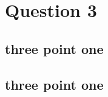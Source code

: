 \documentclass[12pt]{article}
\begin{document}

\section{Question 3}


\subsection{three point one}


\subsection{three point one}

\end{document}
